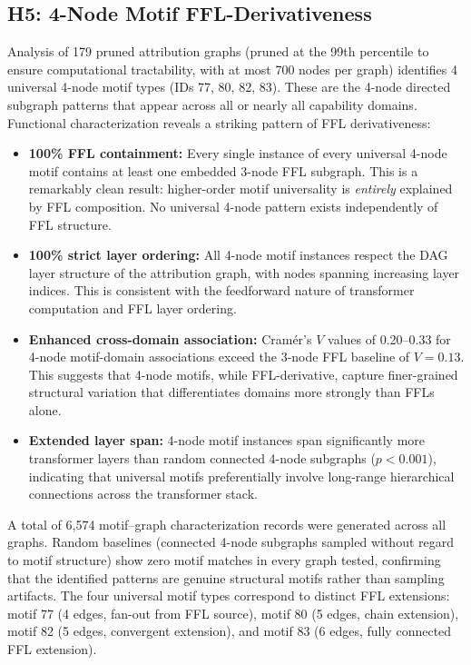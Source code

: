 \subsection{H5: 4-Node Motif FFL-Derivativeness}\label{sec:results_h5}

Analysis of 179 pruned attribution graphs (pruned at the 99th percentile to ensure computational tractability, with at most 700 nodes per graph) identifies 4 universal 4-node motif types (IDs 77, 80, 82, 83). These are the 4-node directed subgraph patterns that appear across all or nearly all capability domains. Functional characterization reveals a striking pattern of FFL derivativeness:

\begin{itemize}
\item \textbf{100\% FFL containment:} Every single instance of every universal 4-node motif contains at least one embedded 3-node FFL subgraph. This is a remarkably clean result: higher-order motif universality is \emph{entirely} explained by FFL composition. No universal 4-node pattern exists independently of FFL structure.
\item \textbf{100\% strict layer ordering:} All 4-node motif instances respect the DAG layer structure of the attribution graph, with nodes spanning increasing layer indices. This is consistent with the feedforward nature of transformer computation and FFL layer ordering.
\item \textbf{Enhanced cross-domain association:} Cram\'{e}r's $V$ values of 0.20--0.33 for 4-node motif-domain associations exceed the 3-node FFL baseline of $V=0.13$. This suggests that 4-node motifs, while FFL-derivative, capture finer-grained structural variation that differentiates domains more strongly than FFLs alone.
\item \textbf{Extended layer span:} 4-node motif instances span significantly more transformer layers than random connected 4-node subgraphs ($p<0.001$), indicating that universal motifs preferentially involve long-range hierarchical connections across the transformer stack.
\end{itemize}

A total of 6,574 motif--graph characterization records were generated across all graphs. Random baselines (connected 4-node subgraphs sampled without regard to motif structure) show zero motif matches in every graph tested, confirming that the identified patterns are genuine structural motifs rather than sampling artifacts. The four universal motif types correspond to distinct FFL extensions: motif 77 (4 edges, fan-out from FFL source), motif 80 (5 edges, chain extension), motif 82 (5 edges, convergent extension), and motif 83 (6 edges, fully connected FFL extension).

